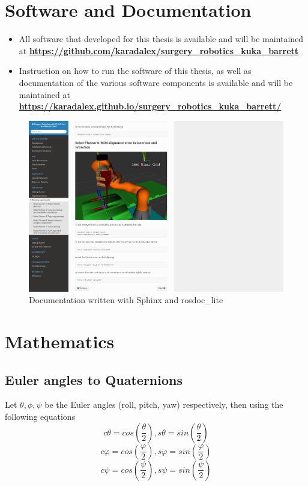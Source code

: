 \section{Software and Documentation}

\begin{itemize}
\item All software that developed for this thesis is available and will be maintained at \textbf{\url{https://github.com/karadalex/surgery_robotics_kuka_barrett}}
\item Instruction on how to run the software of this thesis, as well as documentation of the various software components is available and will be maintained at 
	\textbf{\url{https://karadalex.github.io/surgery_robotics_kuka_barrett/}}
\end{itemize}

\begin{center}
\begin{figure}[!htb]
\centering
\includegraphics[width=\textwidth]{images/documentation.png}
\caption{Documentation written with Sphinx and rosdoc\_lite }
\label{documentation}
\end{figure}
\end{center}

\section{Mathematics}

\subsection{Euler angles to Quaternions}

Let $\theta, \phi, \psi$ be the Euler angles (roll, pitch, yaw) respectively, then using the following equations
\[
cθ = cos\left( \frac{θ}{2} \right) , sθ = sin\left( \frac{θ}{2} \right)
\]
\[
cφ = cos\left( \frac{φ}{2} \right) , sφ = sin\left( \frac{φ}{2} \right)
\]
\[
cψ = cos\left( \frac{ψ}{2} \right) , sψ = sin\left( \frac{ψ}{2} \right)
\]

